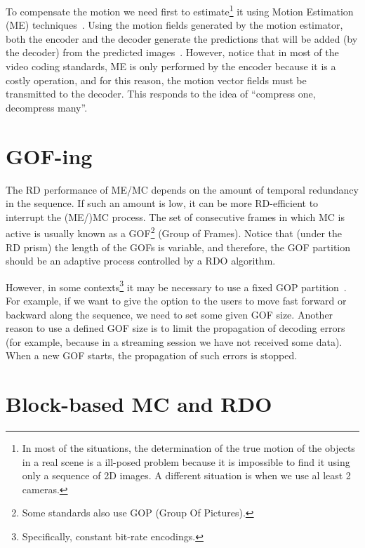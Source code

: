 To compensate the motion we need first to estimate\footnote{In most of
  the situations, the determination of the true motion of the objects
  in a real scene is a ill-posed problem because it is impossible to
  find it using only a sequence of 2D images. A different situation is
  when we use al least 2 cameras.} it using Motion Estimation (ME)
techniques~\cite{vruiz__ME}. Using the motion fields generated by the
motion estimator, both the encoder and the decoder generate the
predictions that will be added (by the
decoder) from the predicted images~\cite{vruiz__MC}. However, notice
that in most of the video coding standards, ME is only performed by
the encoder because it is a costly operation, and for this reason, the
motion vector fields must be transmitted to the decoder. This responds
to the idea of ``compress one, decompress many''.


\section{GOF-ing}

The RD performance of ME/MC depends on the amount of temporal
redundancy in the sequence. If such an amount is low, it can be more
RD-efficient to interrupt the (ME/)MC process. The set of consecutive
frames in which MC is active is usually known as a GOF\footnote{Some
  standards also use GOP (Group Of Pictures).} (Group of
Frames). Notice that (under the RD prism) the length of the GOFs is
variable, and therefore, the GOF partition should be an adaptive
process controlled by a RDO algorithm.

However, in some contexts\footnote{Specifically, constant bit-rate
  encodings.} it may be necessary to use a fixed GOP
partition~\cite{vruiz__MC}. For example, if we want to give the option
to the users to move fast forward or backward along the sequence, we
need to set some given GOF size. Another reason to use a defined GOF
size is to limit the propagation of decoding errors (for example,
because in a streaming session we have not received some data). When a
new GOF starts, the propagation of such errors is stopped.

\section{Block-based MC and RDO}

